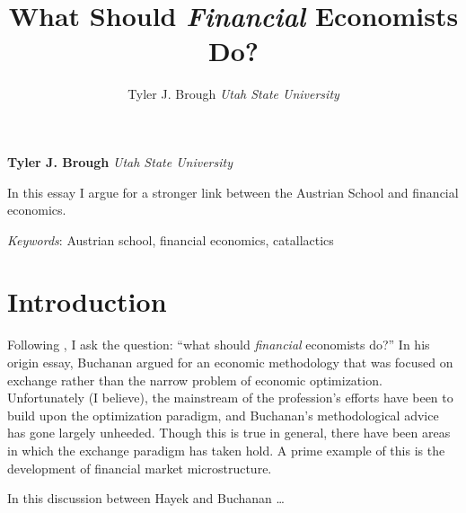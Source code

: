 \documentclass[11pt,]{article}
\title{What Should \emph{Financial} Economists Do?  }
\author{\Large Tyler J. Brough\vspace{0.05in} \newline\normalsize\emph{Utah State University}  }
\date{}
\newcommand*{\authorfont}{\fontfamily{phv}\selectfont}
\renewenvironment{abstract}
 {{%
    \setlength{\leftmargin}{0mm}
    \setlength{\rightmargin}{\leftmargin}%
  }%
  \relax}
 {\endlist}
\begin{document}
	
%

{%
\setlength{\parindent}{0pt}
\thispagestyle{plain}
{\fontsize{18}{20}\selectfont\raggedright 
\maketitle  %

}

{
   \vskip 13.5pt\relax \normalsize\fontsize{11}{12} 
\textbf{\authorfont Tyler J. Brough} \hskip 15pt \emph{\small Utah State University}   

}

}







\begin{abstract}

    \hbox{\vrule height .2pt width 39.14pc}

    \vskip 8.5pt %

\noindent In this essay I argue for a stronger link between the Austrian School
and financial economics.


\vskip 8.5pt \noindent \emph{Keywords}: Austrian school, financial economics, catallactics \par

    \hbox{\vrule height .2pt width 39.14pc}



\end{abstract}


\vskip 6.5pt

\noindent \doublespacing \section{Introduction}\label{introduction}

Following \citet{Buchanan1964}, I ask the question: ``what should
\emph{financial} economists do?'' In his origin essay, Buchanan argued
for an economic methodology that was focused on exchange rather than the
narrow problem of economic optimization. Unfortunately (I believe), the
mainstream of the profession's efforts have been to build upon the
optimization paradigm, and Buchanan's methodological advice has gone
largely unheeded. Though this is true in general, there have been areas
in which the exchange paradigm has taken hold. A prime example of this
is the development of financial market microstructure.

In this discussion between Hayek and Buchanan \citep{BuchananHayek}
\ldots{}

\newpage
\singlespacing 

\end{document}
